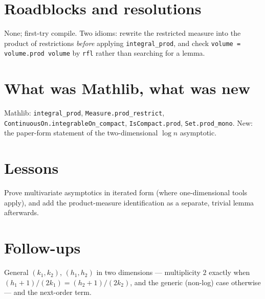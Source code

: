 \documentclass[11pt]{article}
\begin{document}
\section{Roadblocks and resolutions}
None; first-try compile. Two idioms: rewrite the restricted measure into the product of restrictions
\emph{before} applying \texttt{integral\_prod}, and check \texttt{volume = volume.prod volume} by
\texttt{rfl} rather than searching for a lemma.

\section{What was Mathlib, what was new}
Mathlib: \texttt{integral\_prod}, \texttt{Measure.prod\_restrict},
\texttt{ContinuousOn.integrableOn\_compact}, \texttt{IsCompact.prod}, \texttt{Set.prod\_mono}. New: the
paper-form statement of the two-dimensional $\log n$ asymptotic.

\section{Lessons}
Prove multivariate asymptotics in iterated form (where one-dimensional tools apply), and add the
product-measure identification as a separate, trivial lemma afterwards.

\section{Follow-ups}
General $(k_1,k_2)$, $(h_1,h_2)$ in two dimensions --- multiplicity $2$ exactly when
$(h_1+1)/(2k_1)=(h_2+1)/(2k_2)$, and the generic (non-log) case otherwise --- and the next-order term.
\end{document}
